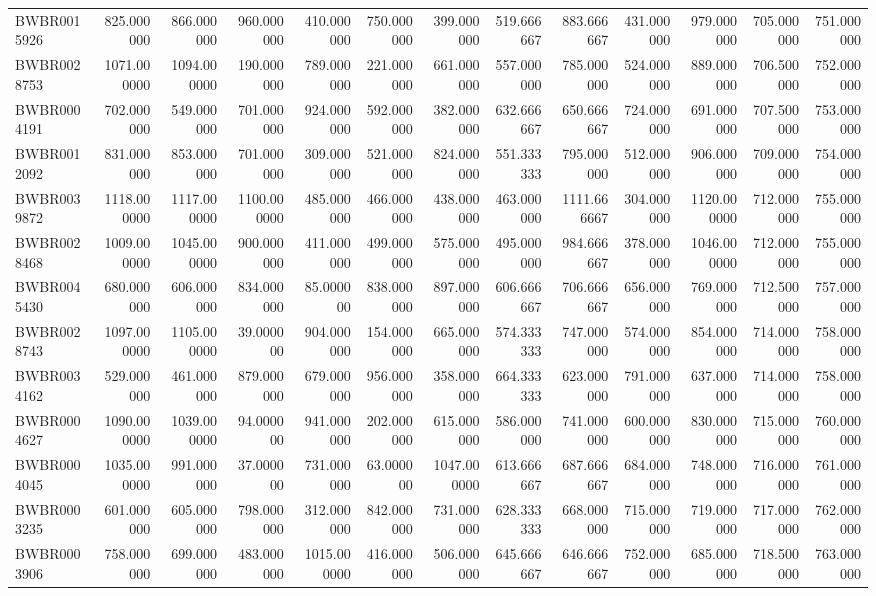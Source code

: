 \begin{longtable}{lrrrrrrrrrrrr}
BWBR0015926 & 825.000000 & 866.000000 & 960.000000 & 410.000000 & 750.000000 & 399.000000 & 519.666667 & 883.666667 & 431.000000 & 979.000000 & 705.000000 & 751.000000 \\
BWBR0028753 & 1071.000000 & 1094.000000 & 190.000000 & 789.000000 & 221.000000 & 661.000000 & 557.000000 & 785.000000 & 524.000000 & 889.000000 & 706.500000 & 752.000000 \\
BWBR0004191 & 702.000000 & 549.000000 & 701.000000 & 924.000000 & 592.000000 & 382.000000 & 632.666667 & 650.666667 & 724.000000 & 691.000000 & 707.500000 & 753.000000 \\
BWBR0012092 & 831.000000 & 853.000000 & 701.000000 & 309.000000 & 521.000000 & 824.000000 & 551.333333 & 795.000000 & 512.000000 & 906.000000 & 709.000000 & 754.000000 \\
BWBR0039872 & 1118.000000 & 1117.000000 & 1100.000000 & 485.000000 & 466.000000 & 438.000000 & 463.000000 & 1111.666667 & 304.000000 & 1120.000000 & 712.000000 & 755.000000 \\
BWBR0028468 & 1009.000000 & 1045.000000 & 900.000000 & 411.000000 & 499.000000 & 575.000000 & 495.000000 & 984.666667 & 378.000000 & 1046.000000 & 712.000000 & 755.000000 \\
BWBR0045430 & 680.000000 & 606.000000 & 834.000000 & 85.000000 & 838.000000 & 897.000000 & 606.666667 & 706.666667 & 656.000000 & 769.000000 & 712.500000 & 757.000000 \\
BWBR0028743 & 1097.000000 & 1105.000000 & 39.000000 & 904.000000 & 154.000000 & 665.000000 & 574.333333 & 747.000000 & 574.000000 & 854.000000 & 714.000000 & 758.000000 \\
BWBR0034162 & 529.000000 & 461.000000 & 879.000000 & 679.000000 & 956.000000 & 358.000000 & 664.333333 & 623.000000 & 791.000000 & 637.000000 & 714.000000 & 758.000000 \\
BWBR0004627 & 1090.000000 & 1039.000000 & 94.000000 & 941.000000 & 202.000000 & 615.000000 & 586.000000 & 741.000000 & 600.000000 & 830.000000 & 715.000000 & 760.000000 \\
BWBR0004045 & 1035.000000 & 991.000000 & 37.000000 & 731.000000 & 63.000000 & 1047.000000 & 613.666667 & 687.666667 & 684.000000 & 748.000000 & 716.000000 & 761.000000 \\
BWBR0003235 & 601.000000 & 605.000000 & 798.000000 & 312.000000 & 842.000000 & 731.000000 & 628.333333 & 668.000000 & 715.000000 & 719.000000 & 717.000000 & 762.000000 \\
BWBR0003906 & 758.000000 & 699.000000 & 483.000000 & 1015.000000 & 416.000000 & 506.000000 & 645.666667 & 646.666667 & 752.000000 & 685.000000 & 718.500000 & 763.000000 \\

\end{longtable}
